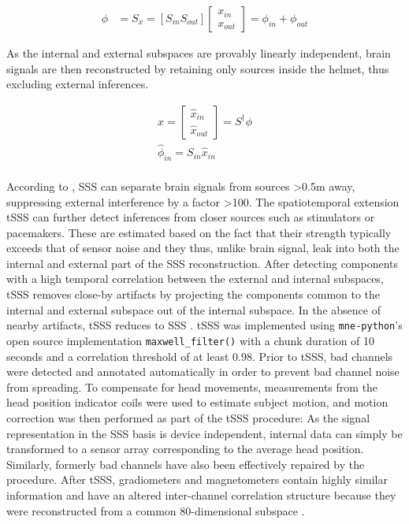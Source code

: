 \begin{equation}
	\begin{aligned}
			\phi &= S_x = [S_{in} S_{out}] \begin{bmatrix}
			x_{in} \\
			x_{out}
		\end{bmatrix} = \phi_{in} + \phi_{out}
	\end{aligned}
	\label{eq:sss}
\end{equation}

As the internal and external subspaces are provably linearly independent, brain signals are then reconstructed by retaining only sources inside the helmet, thus excluding external inferences.


\begin{equation}
	\begin{aligned}
    \hat{x} =
\begin{bmatrix}
	\hat{x}_{in} \\
	\hat{x}_{out}
\end{bmatrix}
= S^{\dagger}\phi \\
\hat{\phi}_{in} = S_{in}\hat{x}_{in}\\
	\end{aligned}
	\label{eq:sss2}
\end{equation}


According to \citet{taulu2006spatiotemporal}, \gls{SSS} can separate brain signals from sources >0.5m away, suppressing external interference by a factor >100.
The spatiotemporal extension \gls{tSSS} can further detect inferences from closer sources such as stimulators or pacemakers.
These are estimated based on the fact that their strength typically exceeds that of sensor noise and they thus, unlike brain signal, leak into both the internal and external part of the \gls{SSS} reconstruction.
After detecting components with a high temporal correlation between the external and internal subspaces, \gls{tSSS} removes close-by artifacts by projecting the components common to the internal and external subspace out of the internal subspace.
In the absence of nearby artifacts, \gls{tSSS} reduces to \gls{SSS} \citep{taulu2009removal}.
\gls{tSSS} was implemented using \texttt{mne-python}'s open source implementation \texttt{maxwell\_filter()} with a chunk duration of 10 seconds and a correlation threshold of at least $0.98$.
Prior to \gls{tSSS}, bad channels were detected and annotated automatically in order to prevent bad channel noise from spreading.
To compensate for head movements, measurements from the head position indicator coils were used to estimate subject motion, and motion correction was then performed as part of the \gls{tSSS} procedure: As the signal representation in the \gls{SSS} basis is device independent, internal data can simply be transformed to a sensor array corresponding to the average head position.
Similarly, formerly bad channels have also been effectively repaired by the procedure.
After \gls{tSSS}, gradiometers and magnetometers contain highly similar information and have an altered inter-channel correlation structure because they were reconstructed from a common 80-dimensional subspace \citep{garces2017choice}.


